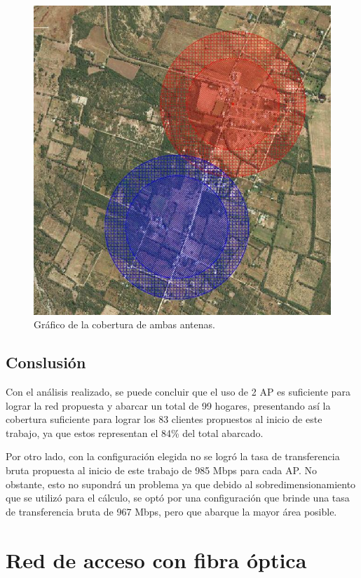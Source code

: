 \documentclass[11pt,a4paper]{article}
\begin{document}
\begin{figure}[ht!]
  \centering
  \includegraphics[width=0.8\linewidth]{fotos_ema/grafico_cobertura.jpg}
  \caption{Gráfico de la cobertura de ambas antenas.}
  \label{fig:grafico_cobertura}
\end{figure}

\subsection{Conslusión}

Con el análisis realizado, se puede concluir que el uso de 2 AP es suficiente para lograr la red propuesta y abarcar un total de 99 hogares, presentando así la cobertura suficiente para lograr los 83 clientes propuestos al inicio de este trabajo, ya que estos representan el 84\% del total abarcado. 

Por otro lado, con la configuración elegida no se logró la tasa de transferencia bruta propuesta al inicio de este trabajo de 985 Mbps para cada AP. No obstante, esto no supondrá un problema ya que debido al sobredimensionamiento que se utilizó para el cálculo, se optó por una configuración que brinde una tasa de transferencia bruta de 967 Mbps, pero que abarque la mayor área posible.



\section{Red de acceso con fibra óptica}
\end{document}
